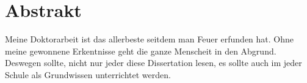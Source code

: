 \chapter*{Abstrakt}
\thispagestyle{empty}

Meine Doktorarbeit ist das allerbeste seitdem man Feuer erfunden hat.
Ohne meine gewonnene Erkentnisse geht die ganze Menscheit in den Abgrund.
Deswegen sollte, nicht nur jeder diese Dissertation lesen, es sollte auch im jeder Schule als Grundwissen unterrichtet werden.